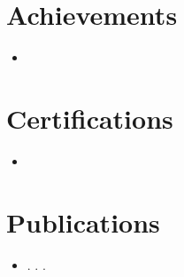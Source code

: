 \documentclass[letterpaper,11pt]{article}
\begin{document}
\section{Achievements}
\begin{itemize}[leftmargin=0.45em, label={\textbullet}, itemsep=1pt, parsep=0pt, topsep=2pt]
    \item \small {}
\end{itemize}

\section{Certifications}
\begin{itemize}[leftmargin=0.45em, label={\textbullet}, itemsep=1pt, parsep=0pt, topsep=2pt]
    \item \small {}
\end{itemize}

\section{Publications}
\begin{itemize}[leftmargin=0in, label={}]
    \item \small \textbf{}. \textit{}. .
\end{itemize}
\end{document}
